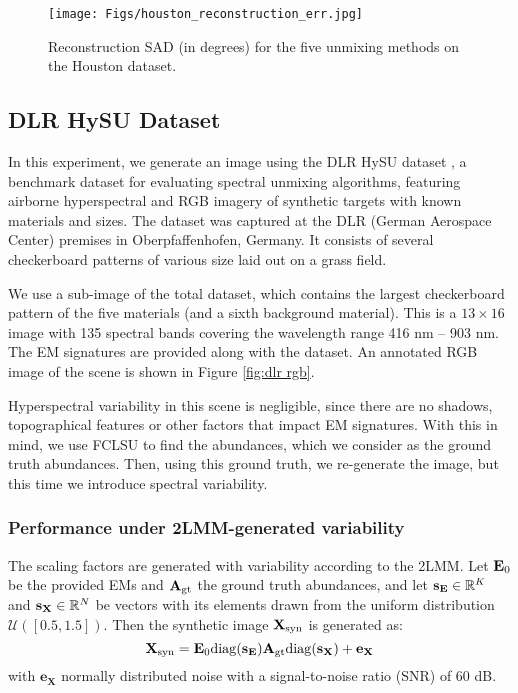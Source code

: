 \begin{figure*}[t]
    \centering
    \texttt{[image: Figs/houston\_reconstruction\_err.jpg]}
    \caption{Reconstruction SAD (in degrees) for the five unmixing methods on the Houston dataset.}
    \label{fig: reconstruction error}
\end{figure*}

\subsection{DLR HySU Dataset} \label{sec: dlr hysu}

In this experiment, we generate an image using the DLR HySU dataset \cite{cerra_dlr_2021}, a benchmark dataset for evaluating spectral unmixing algorithms, featuring airborne hyperspectral and RGB imagery of synthetic targets with known materials and sizes. The dataset was captured at the DLR (German Aerospace Center) premises in Oberpfaffenhofen, Germany. It consists of several checkerboard patterns of various size laid out on a grass field.


We use a sub-image of the total dataset, which contains the largest checkerboard pattern of the five materials (and a sixth background material). This is a $13 \times 16$ image with 135 spectral bands covering the wavelength range 416 nm -- 903 nm. The EM signatures are provided along with the dataset.
An annotated RGB image of the scene is shown in Figure \ref{fig:dlr rgb}.

Hyperspectral variability in this scene is negligible, since there are no shadows, topographical features or other factors that impact EM signatures. With this in mind, we use FCLSU to find the abundances, which we consider as the ground truth abundances. Then, using this ground truth, we re-generate the image, but this time we introduce spectral variability.

\subsubsection{Performance under 2LMM-generated variability}

The scaling factors are generated with variability according to the 2LMM. Let $\mathbf{E}_0$ be the provided EMs and $\mathbf{A}_\mathrm{gt}$ the ground truth abundances, and let $\mathbf{s}_{\mathbf{E}} \in \mathbb{R}^K$ and $\mathbf{s}_{\mathbf{X}} \in \mathbb{R}^N$ be vectors with its elements drawn from the uniform distribution $\mathcal{U}([0.5,1.5])$. Then the synthetic image $\mathbf{X}_\mathrm{syn}$ is generated as:
\[
    \mathbf{X}_\mathrm{syn} = \mathbf{E}_0  \mathrm{diag} (\mathbf{s}_{\mathbf{E}}) \mathbf{A}_\mathrm{gt} \mathrm{diag}(\mathbf{s}_{\mathbf{X}}) + \mathbf{e}_{\mathbf{X}}
\]
with $\mathbf{e}_\mathbf{X}$ normally distributed noise with a signal-to-noise ratio (SNR) of 60 dB. 

